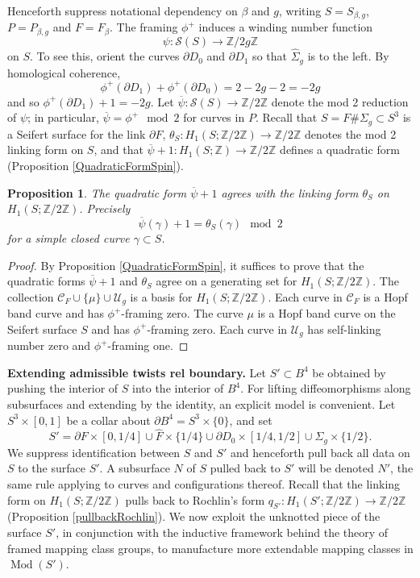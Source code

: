\documentclass[10pt]{amsart}
\numberwithin{equation}{section}
\theoremstyle{plain}
\newtheorem{proposition}[theorem]{Proposition}
\theoremstyle{definition}
\theoremstyle{remark}
\DeclareMathOperator{\Mod}{Mod}
\begin{document}
Henceforth suppress notational dependency on $\beta$ and $g$, writing $S = S_{\beta,g}$, $P = P_{\beta,g}$ and $F = F_{\beta}$.  The framing $\phi^+$ induces a winding number function \[\psi  : \mathcal{S}(S) \to \mathbb{Z}/2g\mathbb{Z}\] on $S$. To see this, orient the curves $\partial D_0$ and $\partial D_1$ so that $\widehat{\Sigma}_g$ is to the left. By homological coherence, \[\phi^+(\partial D_1) + \phi^+(\partial D_0)  = 2-2g - 2 = -2g\] and so $\phi^+(\partial D_1) +1 = -2g$. Let $\overline{\psi} : \mathcal{S}(S) \to \mathbb{Z}/2\mathbb{Z}$ denote the mod 2 reduction of $\psi$; in particular, $\overline{\psi} = \phi^+ \mod 2$ for curves in $P$. Recall that $S = F \# \Sigma_g\subset S^3$ is a Seifert surface for the link $\partial F$, $\theta_S : H_1(S;\mathbb{Z}/2\mathbb{Z}) \to \mathbb{Z}/2\mathbb{Z}$ denotes the mod 2 linking form on $S$, and that  $\overline{\psi} +1 : H_1(S;\mathbb{Z}) \to \mathbb{Z}/2\mathbb{Z}$ defines a quadratic form   (Proposition \ref{QuadraticFormSpin}). 


\begin{proposition} \label{framingmod2}
The  quadratic form $\overline{\psi}+1$ agrees with the linking form $\theta_S$ on $H_1(S;\mathbb{Z}/2\mathbb{Z})$. Precisely  \[\overline{\psi}(\gamma) +1= \theta_S(\gamma)   \mod 2\]for a simple closed curve $\gamma \subset S$.  
\end{proposition}

\begin{proof}
By Proposition \ref{QuadraticFormSpin}, it suffices to prove that the quadratic forms $\overline{\psi}+1$ and $\theta_S$ agree on a generating set for $H_1(S;\mathbb{Z}/2\mathbb{Z})$. The collection $\mathcal{C}_{F} \cup \{\mu\} \cup \mathcal{U}_g$ is a basis for $H_1(S;\mathbb{Z}/2\mathbb{Z})$. Each curve in $\mathcal{C}_{F}$ is a Hopf band curve and has $\phi^+$-framing zero. The curve $\mu$ is a Hopf band curve on the Seifert surface $S$ and has $\phi^+$-framing zero. Each curve in $\mathcal{U}_g$ has self-linking number zero and $\phi^+$-framing one.   
\end{proof}

\textbf{Extending admissible twists rel boundary.} Let $S' \subset B^4$ be obtained by pushing the interior of $S$ into the interior of $B^4$. For lifting diffeomorphisms along subsurfaces and extending by the identity, an explicit model is convenient. Let $S^3 \times [0,1]$ be a collar about $\partial B^4 = S^3 \times \{0\}$, and set $$S' = \partial F \times [0,1/4] \cup \widehat{F} \times \{1/4\} \cup \partial D_0\times [1/4,1/2] \cup \widehat{\Sigma}_g\times \{1/2\}.$$ We suppress identification between $S$ and $S'$ and henceforth pull back all data on $S$ to the surface $S'$. A subsurface $N$ of $S$ pulled back to $S'$ will be denoted $N'$, the same rule applying to curves and configurations thereof. Recall that the linking form on $H_1(S;\mathbb{Z}/2\mathbb{Z})$ pulls back to Rochlin's form $q_{S'}: H_1(S';\mathbb{Z}/2\mathbb{Z}) \to \mathbb{Z}/2\mathbb{Z}$ (Proposition \ref{pullbackRochlin}). We now exploit the unknotted piece of the surface $S'$, in conjunction with the inductive framework behind the theory of framed mapping class groups,  to manufacture more extendable mapping classes in $\Mod(S')$.
\end{document}
